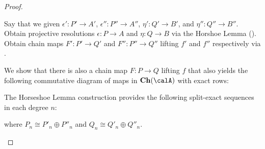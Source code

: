 \begin{proof}
\begin{enumerate}
\begin{enumerate}
        \medskip
        Say that we given  $\epsilon': P' \to A'$, $\epsilon'': P'' \to A''$, $\eta': Q' \to B'$, and $\eta'' : Q'' \to B''$. Obtain projective resolutions $\epsilon: P \to A$ and $\eta: Q \to B$ via the Horshoe Lemma (). Obtain chain maps $F': P' \to Q'$ and $F'': P'' \to Q''$ lifting $f'$ and $f''$ respectively via . 

        \medskip
        We show that there is also a chain map $F: P \to Q$ lifting $f$ that also yields the following commutative diagram of maps in $\mathbf{Ch}(\calA)$ with exact rows:
        \begin{center}
        \end{center}


        \medskip
        The Horseshoe Lemma construction provides the following split-exact sequences in each degree $n$:
        \begin{center}
        \end{center}
        where $P_n \cong P'_n \oplus P''_n$ and $Q_n \cong Q'_n \oplus Q''_n$.


\end{enumerate}
\end{enumerate}
\end{proof}
